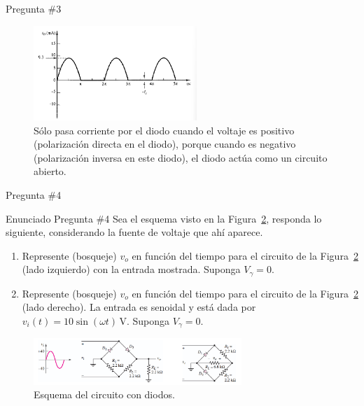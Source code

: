 \documentclass[
    10pt,
    aspectratio=169,
    xcolor={dvipsnames},
    spanish,
    ]{beamer}
\begin{document}
\begin{frame}{Pregunta \#3}
\begin{figure}[H]
    \centering
    \includegraphics[width=0.55\textwidth]{Auxiliar_4_16}
  \caption{Sólo pasa corriente por el diodo cuando el voltaje es positivo (polarización directa en el diodo), porque cuando es negativo (polarización inversa en este diodo), el diodo actúa como un circuito abierto.}
    \label{fig:voltaje-corriente-diodo-detalle}
\end{figure}
\end{frame}
\begin{frame}{Pregunta \#4}
  \begin{block}{Enunciado Pregunta \#4}
   Sea el esquema visto en la Figura~\ref{fig:P2_17}, responda lo siguiente, considerando la fuente de voltaje que ahí aparece.
\begin{enumerate}
    \item Represente (bosqueje) $v_o$ en función del tiempo para el circuito de la Figura~\ref{fig:P2_17} (lado izquierdo) con la entrada mostrada. Suponga $V_\gamma = 0$.
    \item Represente (bosqueje) $v_o$ en función del tiempo para el circuito de la Figura~\ref{fig:P2_17} (lado derecho). La entrada es senoidal y está dada por $v_i(t) = 10 \sin(\omega t)\,\text{V}$. Suponga $V_\gamma = 0$.
\end{enumerate}
  \end{block}
\begin{figure}[H]
    \centering
    \includegraphics[width=0.7\textwidth]{Auxiliar_4_18}
  \caption{Esquema del circuito con diodos.}
    \label{fig:P2_17}
\end{figure}
\end{frame}
\end{document}
